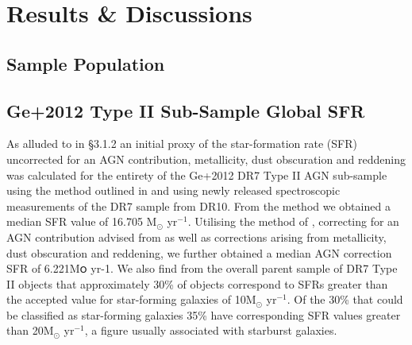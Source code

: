 \section{Results \& Discussions}
\subsection{Sample Population}
\subsection{Ge+2012 Type II Sub-Sample Global SFR}

As alluded to in §3.1.2 an initial proxy of the star-formation rate (SFR) uncorrected for an AGN contribution, metallicity, dust obscuration and reddening was calculated for the entirety of the Ge+2012 DR7 Type II AGN sub-sample using the method outlined in \cite{Kennicutt_1998} and using newly released spectroscopic measurements of the DR7 sample from DR10. From the \cite{Kennicutt_1998} method we obtained a median SFR value of 16.705 M$_{\odot}$ yr$^{-1}$. Utilising the method of \cite{Kewley_2004}, correcting for an AGN contribution advised from \cite{2006ApJ...642..702K} as well as corrections arising from metallicity, dust obscuration and reddening, we further obtained a median AGN correction SFR of 6.221M၀ yr-1. We also find from the overall parent sample of DR7 Type II objects that approximately 30\% of objects correspond to SFRs greater than the accepted value for star-forming galaxies of 10M$_{\odot}$ yr$^{-1}$. Of the 30\% that could be classified as star-forming galaxies 35\% have corresponding SFR values greater than 20M$_{\odot}$ yr$^{-1}$, a figure usually associated with starburst galaxies.


